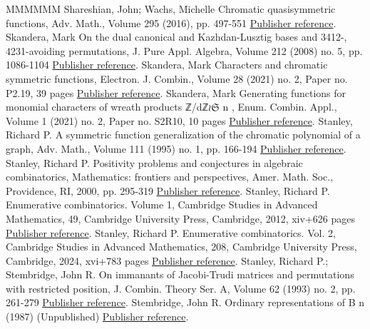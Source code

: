 \documentclass[11pt]{article}
\theoremstyle{definition}
\numberwithin{equation}{section}
\begin{document}
\begin{thebibliography}{MMMMMM}
 Shareshian, John; Wachs, Michelle Chromatic quasisymmetric functions, Adv. Math., Volume 295 (2016), pp. 497-551 \href{https://alco.centre-mersenne.org/articles/10.5802/alco.459/#SWachsChromQF}{Publisher reference}.
 Skandera, Mark On the dual canonical and Kazhdan-Lusztig bases and 3412-, 4231-avoiding permutations, J. Pure Appl. Algebra, Volume 212 (2008) no. 5, pp. 1086-1104 \href{https://alco.centre-mersenne.org/articles/10.5802/alco.459/#SkanNNDCB}{Publisher reference}.
 Skandera, Mark Characters and chromatic symmetric functions, Electron. J. Combin., Volume 28 (2021) no. 2, Paper no. P2.19, 39 pages \href{https://alco.centre-mersenne.org/articles/10.5802/alco.459/#SkanCCS}{Publisher reference}.
 Skandera, Mark Generating functions for monomial characters of wreath products ℤ/dℤ\(\wr\)\(\mathfrak{S}\) n , Enum. Combin. Appl., Volume 1 (2021) no. 2, Paper no. S2R10, 10 pages \href{https://alco.centre-mersenne.org/articles/10.5802/alco.459/#SkanGenFnWreath}{Publisher reference}.
 Stanley, Richard P. A symmetric function generalization of the chromatic polynomial of a graph, Adv. Math., Volume 111 (1995) no. 1, pp. 166-194 \href{https://alco.centre-mersenne.org/articles/10.5802/alco.459/#StanSymm}{Publisher reference}.
 Stanley, Richard P. Positivity problems and conjectures in algebraic combinatorics, Mathematics: frontiers and perspectives, Amer. Math. Soc., Providence, RI, 2000, pp. 295-319 \href{https://alco.centre-mersenne.org/articles/10.5802/alco.459/#StanPos}{Publisher reference}.
 Stanley, Richard P. Enumerative combinatorics. Volume 1, Cambridge Studies in Advanced Mathematics, 49, Cambridge University Press, Cambridge, 2012, xiv+626 pages \href{https://alco.centre-mersenne.org/articles/10.5802/alco.459/#StanEC1}{Publisher reference}.
 Stanley, Richard P. Enumerative combinatorics. Vol. 2, Cambridge Studies in Advanced Mathematics, 208, Cambridge University Press, Cambridge, 2024, xvi+783 pages \href{https://alco.centre-mersenne.org/articles/10.5802/alco.459/#StanEC2}{Publisher reference}.
 Stanley, Richard P.; Stembridge, John R. On immanants of Jacobi-Trudi matrices and permutations with restricted position, J. Combin. Theory Ser. A, Volume 62 (1993) no. 2, pp. 261-279 \href{https://alco.centre-mersenne.org/articles/10.5802/alco.459/#StanStemIJT}{Publisher reference}.
 Stembridge, John R. Ordinary representations of B n  (1987) (Unpublished) \href{https://alco.centre-mersenne.org/articles/10.5802/alco.459/#StemOrdRep}{Publisher reference}.

\end{thebibliography}
\end{document}

